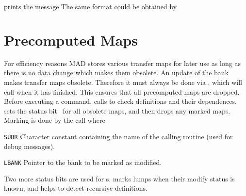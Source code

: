 prints the message
The same format could be obtained by

\section{Precomputed Maps}
\label{AAMARK}
\label{AAPDRP}
\label{AAPMOD}
For efficiency reasons MAD stores various transfer maps for later use
as long as there is no data change which makes them obsolete.
An update of the  bank makes transfer maps obsolete.
Therefore it must always be done via ,
which will call  when it has finished.
This ensures that all precomputed maps are dropped.
Before executing a command,  calls  to
check definitions and their dependences.
 sets the status bit~ for all obsolete
maps,
and then drops any marked maps.
Marking is done by the call
where
\begin{mylist}
\item[\tt SUBR]
Character constant containing the name of the calling routine
(used for debug messages).
\item[\tt LBANK]
Pointer to the bank to be marked as modified.
\end{mylist}

Two more status bits are used for s.
 marks lumps when their modify status is known,
and  helps to detect recursive  definitions.

